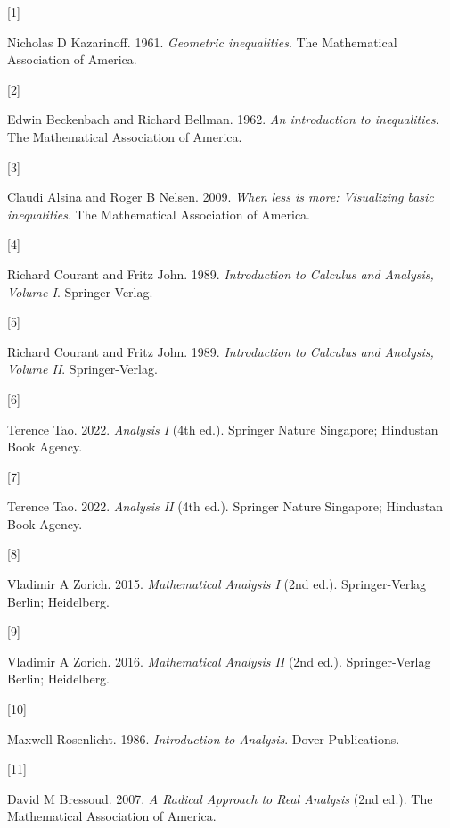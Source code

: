 \documentclass[
  a4paper,
]{article}
\newlength{\cslhangindent}
\newlength{\csllabelwidth}
\newenvironment{CSLReferences}[2] %
 {\begin{list}{}{%
  \setlength{\itemindent}{0pt}
  \setlength{\leftmargin}{0pt}
  \setlength{\parsep}{0pt}
  \ifodd #1
   \setlength{\leftmargin}{\cslhangindent}
   \setlength{\itemindent}{-1\cslhangindent}
  \fi
  \setlength{\itemsep}{#2\baselineskip}}}
 {\end{list}}
\newcommand{\CSLLeftMargin}[1]{\parbox[t]{\csllabelwidth}{\strut#1\strut}}
\newcommand{\CSLRightInline}[1]{\parbox[t]{\linewidth - \csllabelwidth}{\strut#1\strut}}
\begin{document}
\label{refs}
\begin{CSLReferences}{0}{0}
\CSLLeftMargin{{[}1{]} }%
\CSLRightInline{Nicholas D Kazarinoff. 1961. \emph{Geometric
inequalities}. The Mathematical Association of America.}

\CSLLeftMargin{{[}2{]} }%
\CSLRightInline{Edwin Beckenbach and Richard Bellman. 1962. \emph{An
introduction to inequalities}. The Mathematical Association of America.}

\CSLLeftMargin{{[}3{]} }%
\CSLRightInline{Claudi Alsina and Roger B Nelsen. 2009. \emph{When less
is more: Visualizing basic inequalities}. The Mathematical Association
of America.}

\CSLLeftMargin{{[}4{]} }%
\CSLRightInline{Richard Courant and Fritz John. 1989.
\emph{{Introduction to Calculus and Analysis, Volume I}}.
Springer-Verlag.}

\CSLLeftMargin{{[}5{]} }%
\CSLRightInline{Richard Courant and Fritz John. 1989.
\emph{{Introduction to Calculus and Analysis, Volume II}}.
Springer-Verlag.}

\CSLLeftMargin{{[}6{]} }%
\CSLRightInline{Terence Tao. 2022. \emph{{Analysis I}} (4th ed.).
Springer Nature Singapore; Hindustan Book Agency.}

\CSLLeftMargin{{[}7{]} }%
\CSLRightInline{Terence Tao. 2022. \emph{{Analysis II}} (4th ed.).
Springer Nature Singapore; Hindustan Book Agency.}

\CSLLeftMargin{{[}8{]} }%
\CSLRightInline{Vladimir A Zorich. 2015. \emph{{Mathematical Analysis
I}} (2nd ed.). Springer-Verlag Berlin; Heidelberg.}

\CSLLeftMargin{{[}9{]} }%
\CSLRightInline{Vladimir A Zorich. 2016. \emph{{Mathematical Analysis
II}} (2nd ed.). Springer-Verlag Berlin; Heidelberg.}

\CSLLeftMargin{{[}10{]} }%
\CSLRightInline{Maxwell Rosenlicht. 1986. \emph{{Introduction to
Analysis}}. Dover Publications.}

\CSLLeftMargin{{[}11{]} }%
\CSLRightInline{David M Bressoud. 2007. \emph{{A Radical Approach to
Real Analysis}} (2nd ed.). The Mathematical Association of America.}


\end{CSLReferences}
\end{document}
